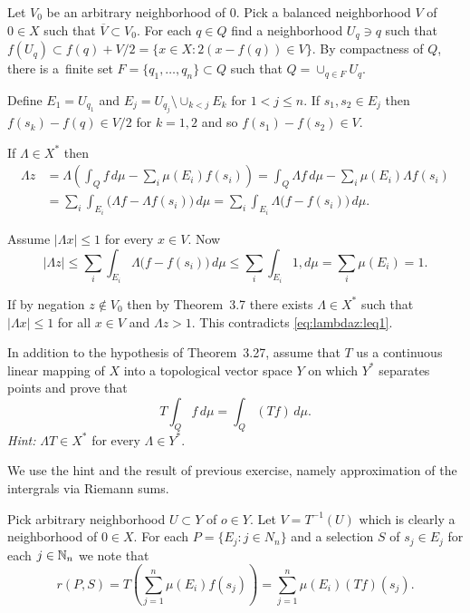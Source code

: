 \begin{enumerate}
Let $V_0$ be an arbitrary neighborhood of $0$.
Pick a balanced neighborhood $V$ of \(0\in X\) 
such that \(\overline{V} \subset V_0\).
For each \(q\in Q\) find a neighborhood \(U_q \ni q\) such that 
\(f(U_q) \subset f(q) + V/2 = \{x\in X: 2(x - f(q)) \in V\}\).
By compactness of $Q$, there is 
a~finite set \(F = \{q_1,\ldots,q_n\} \subset Q\)
such that \(Q = \cup_{q\in F} U_q\).

Define \(E_1 = U_{q_1}\) and \(E_j = U_{q_j} \setminus \cup_{k<j} E_k\)
for \(1 < j \leq n\).
If \(s_1,s_2\in E_j\) then
\(f(s_k) - f(q) \in V/2\) for \(k=1,2\) and so 
\(f(s_1) - f(s_2) \in V\).

If \(\Lambda \in X^*\) then
\begin{align*}
\Lambda z
 &= \Lambda\left( \int_Q f\,d\mu - \sum_i \mu(E_i)f(s_i) \right)
  = \int_Q \Lambda f\,d\mu - \sum_i \mu(E_i) \Lambda f(s_i)  \\
 &= \sum_i \int_{E_i} \bigl(\Lambda f -  \Lambda f(s_i)\bigr)\,d\mu
  = \sum_i \int_{E_i} \Lambda \bigl(f - f(s_i)\bigr)\,d\mu.
\end{align*}

Assume \(|\Lambda x| \leq 1\) for every \(x \in V\). Now
\begin{equation}  \label{eq:lambdaz:leq1}
|\Lambda z| 
 \leq \sum_i \int_{E_i} \Lambda \bigl(f - f(s_i)\bigr)\,d\mu
 \leq \sum_i \int_{E_i} 1,d\mu
 = \sum_i \mu(E_i) = 1.
\end{equation}

If by negation \(z\notin V_0\) then by Theorem~3.7
 there exists \(\Lambda\in X^*\)
such that \(|\Lambda x| \leq 1\) for all \(x \in V\)
and \(\Lambda z > 1\). This contradicts \eqref{eq:lambdaz:leq1}.


\begin{excopy}
In addition to the hypothesis of Theorem~3.27, assume that $T$ us a continuous
linear mapping of $X$ into a topological vector space $Y$ on which \(Y^*\)
separates points and prove that
\begin{equation*}
T\int_Q f\,d\mu = \int_Q (Tf)\,d\mu.
\end{equation*}
\emph{Hint:} \(\Lambda T \in X^*\) for every \(\Lambda \in Y^*\).
\end{excopy}

We use the hint and the result of previous exercise, namely approximation 
of the intergrals via Riemann sums.

Pick arbitrary neighborhood \(U \subset Y\) of \(o\in Y\).
Let \(V = T^{-1}(U)\) which is clearly a neighborhood of \(0\in X\).
For each \(P = \{E_j: j \in N_n\}\) 
and a selection $S$ of \(s_j \in E_j\) for each \(j\in \mathbb{N}_n\) 
we note that
\begin{equation*}
r(P,S) = T\left(\sum_{j=1}^n \mu(E_i)f(s_j)\right) = \sum_{j=1}^n \mu(E_i)(Tf)(s_j).
\end{equation*}


\end{enumerate}
